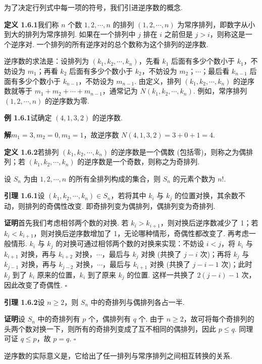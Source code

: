 \documentclass[UTF8,12pt,a4paper,fontset=fandol]{ctexart}
\begin{document}
为了决定行列式中每一项的符号，我们引进逆序数的概念.

\noindent\textbf{定义 1.6.1}\quad 我们称 $n$ 个数 $1,2,\cdots,n$ 的排列 $(1,2,\cdots,n)$ 为常序排列，即数字从小到大的排列为常序排列. 如果在一个排列中 $j$ 排在 $i$ 之前但是 $j>i$，则称这是一个逆序对. 一个排列的所有逆序对的总个数称为这个排列的逆序数.

逆序数的求法是：设排列为 $(k_1,k_2,\cdots,k_n)$，先看 $k_1$ 后面有多少个数小于 $k_1$，不妨设为 $m_1$；再看 $k_2$ 后面有多少个数小于 $k_2$，不妨设为 $m_2$；$\cdots$；最后看 $k_{n-1}$ 后面有多少个数小于 $k_{n-1}$，不妨设为 $m_{n-1}$. 由定义，排列 $(k_1,k_2,\cdots,k_n)$ 的逆序数就等于 $m_1+m_2+\cdots+m_{n-1}$，通常记为 $N(k_1,k_2,\cdots,k_n)$. 例如，常序排列 $(1,2,\cdots,n)$ 的逆序数为零.

\noindent\textbf{例 1.6.1}\quad 试确定 $(4,1,3,2)$ 的逆序数.

\noindent\textbf{解}\quad $m_1=3,m_2=0,m_3=1$，故逆序数 $N(4,1,3,2)=3+0+1=4$.

\noindent\textbf{定义 1.6.2}\quad 若排列 $(k_1,k_2,\cdots,k_n)$ 的逆序数是一个偶数 (包括零)，则称之为偶排列；若 $(k_1,k_2,\cdots,k_n)$ 的逆序数是一个奇数，则称之为奇排列.

设 $S_n$ 为由 $1,2,\cdots,n$ 的所有全排列构成的集合，则 $S_n$ 的元素个数为 $n!$.

\noindent\textbf{引理 1.6.1}\quad 设 $(k_1,k_2,\cdots,k_n)\in S_n$，若将其中 $k_i$ 与 $k_j$ 的位置对换，其余数不动，则排列的奇偶性改变. 即奇排列变为偶排列，偶排列变为奇排列.

\noindent\textbf{证明}\quad 首先我们考虑相邻两个数的对换. 若 $k_i>k_{i+1}$，则对换后逆序数减少了 1；若 $k_i<k_{i+1}$，则对换后逆序数增加了 1，无论哪种情形，奇偶性都改变了. 再考虑一般情形. $k_i$ 与 $k_j$ 的对换可通过相邻两个数的对换来实现：不妨设 $i<j$，将 $k_i$ 与 $k_{i+1}$ 对换，再与 $k_{i+2}$ 对换，$\cdots$，最后与 $k_j$ 对换 (共换了 $j-i$ 次)；再将 $k_j$ 与 $k_{j-1}$ 对换，再与 $k_{j-2}$ 对换，$\cdots$，最后与 $k_{i+1}$ 对换 (共换了 $j-i-1$ 次)；此时 $k_j$ 到了 $k_i$ 原来的位置，$k_i$ 到了原来 $k_j$ 的位置. 这样一共换了 $2(j-i)-1$ 次，因此改变了奇偶性. \(\square\)

\noindent\textbf{引理 1.6.2}\quad 设 $n\ge 2$，则 $S_n$ 中的奇排列与偶排列各占一半.

\noindent\textbf{证明}\quad 设 $S_n$ 中的奇排列有 $p$ 个，偶排列有 $q$ 个. 由于 $n\ge 2$，故可将每个奇排列的头两个数对换一下，则所有的奇排列变成了互不相同的偶排列，因此 $p\le q$. 同理可证 $q\le p$，故 $p=q$. \(\square\)

逆序数的实际意义是，它给出了任一排列与常序排列之间相互转换的关系.
\end{document}
